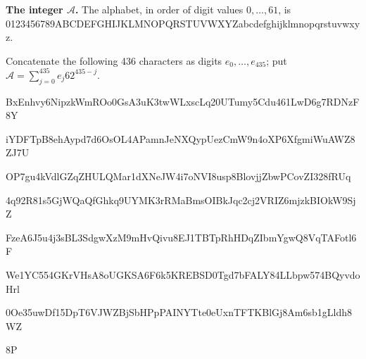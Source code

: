 \textbf{The integer $\mathcal A$.}
The alphabet, in order of digit values $0,\ldots,61$, is
{\fontsize{7.7}{8.2}\selectfont\ttfamily 0123456789ABCDEFGHIJKLMNOPQRSTUVWXYZabcdefghijklmnopqrstuvwxyz}.\par
Concatenate the following 436 characters as digits $e_0,\ldots,e_{435}$;
put $\mathcal A=\sum_{j=0}^{435}e_j62^{435-j}$.\par
\begingroup\fontsize{7.7}{8.2}\selectfont\ttfamily
BxEnhvy6NipzkWmROo0GsA3uK3twWLxscLq20UTumy5Cdu461LwD6g7RDNzF8Y\par
iYDFTpB8ehAypd7d6OsOL4APamnJeNXQypUezCmW9n4oXP6XfgmiWuAWZ8ZJ7U\par
OP7gu4kVdlGZqZHULQMar1dXNeJW4i7oNVI8usp8BlovjjZbwPCovZI328fRUq\par
4q92R81s5GjWQaQfGhkq9UYMK3rRMaBmsOIBkJqc2cj2VRIZ6mjzkBIOkW9SjZ\par
FzeA6J5u4j3sBL3SdgwXzM9mHvQivu8EJ1TBTpRhHDqZIbmYgwQ8VqTAFotl6F\par
We1YC554GKrVHsA8oUGKSA6F6k5KREBSD0Tgd7bFALY84LLbpw574BQyvdoHrl\par
0Oe35uwDf15DpT6VJWZBjSbHPpPAINYTte0eUxnTFTKBlGj8Am6sb1gLldh8WZ\par
8P\par
\endgroup

\endgroup

